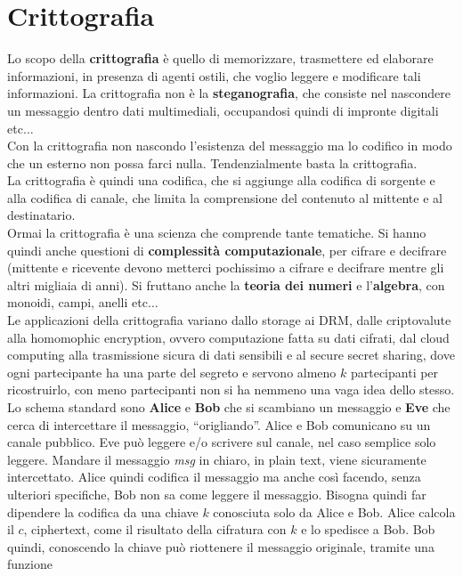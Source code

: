 \documentclass[a4paper,12pt, oneside]{book}
\begin{document}
\chapter{Crittografia}
Lo scopo della \textbf{crittografia} è quello di memorizzare, trasmettere ed
elaborare informazioni, in presenza di agenti ostili, che voglio leggere e
modificare tali informazioni. La crittografia non è la \textbf{steganografia},
che consiste nel nascondere un messaggio dentro dati multimediali, occupandosi
quindi di impronte digitali etc$\ldots$\\
Con la crittografia non nascondo l'esistenza del messaggio ma lo codifico in
modo che un esterno non possa farci nulla. Tendenzialmente basta la
crittografia. \\
La crittografia è quindi una codifica, che si aggiunge alla codifica di
sorgente e alla codifica di canale, che limita la comprensione del contenuto al
mittente e al destinatario.\\
Ormai la crittografia è una scienza che comprende tante tematiche. Si hanno
quindi anche questioni di \textbf{complessità computazionale}, per cifrare e
decifrare (mittente e ricevente devono metterci pochissimo a cifrare e decifrare
mentre gli altri migliaia di anni). Si fruttano anche la \textbf{teoria dei
  numeri} e l'\textbf{algebra}, con monoidi, campi, anelli etc$\ldots$ \\
Le applicazioni della crittografia variano dallo storage ai DRM, dalle
criptovalute alla homomophic encryption, ovvero computazione fatta su dati
cifrati, dal cloud computing alla trasmissione sicura di dati sensibili e al
secure secret sharing, dove ogni partecipante ha una parte del segreto e servono
almeno $k$ partecipanti per ricostruirlo, con meno partecipanti non si ha
nemmeno una vaga idea dello stesso.\\
Lo schema standard sono \textbf{Alice} e \textbf{Bob} che si scambiano un
messaggio e \textbf{Eve} che cerca di intercettare il messaggio,
``origliando''. Alice e Bob comunicano su un canale pubblico. Eve può leggere
e/o scrivere sul canale, nel caso semplice solo leggere. Mandare il messaggio
\textit{msg} in 
chiaro, in plain text, viene sicuramente intercettato. Alice quindi codifica il
messaggio ma anche così facendo, senza ulteriori specifiche, Bob non sa come
leggere il messaggio. Bisogna quindi far dipendere la codifica da una chiave $k$
conosciuta solo da Alice e Bob. Alice calcola il $c$, ciphertext, come il
risultato della cifratura con $k$ e lo spedisce a Bob. Bob quindi, conoscendo la
chiave può riottenere il messaggio originale, tramite una funzione
\end{document}
